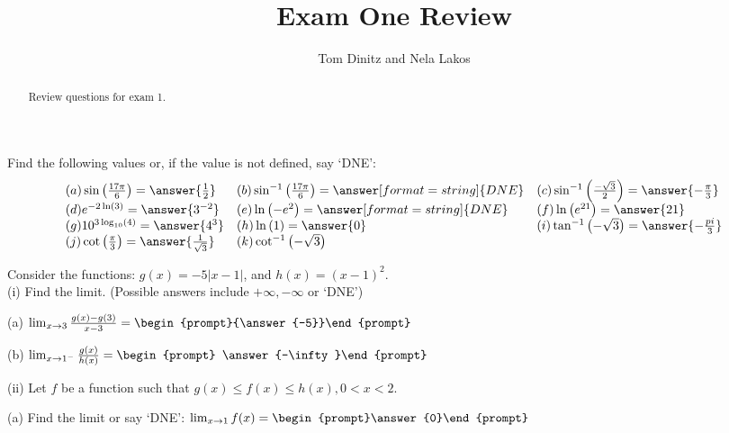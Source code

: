 \documentclass{ximera}
\author{Tom Dinitz and Nela Lakos}
\title{Exam One Review}
\begin{document}
\begin{abstract}
Review questions for exam 1.
\end{abstract}
\maketitle

\begin{exercise}
Find the following values or, if the value is not defined, say `DNE':
\[
\begin{array}{l l l}
(a) \sin\left(\frac{17\pi}{6}\right)=\answer{\frac{1}{2}} & (b) \sin^{-1}\left(\frac{17\pi}{6}\right)=\answer[format=string]{DNE} & (c) \sin^{-1}\left(\frac{-\sqrt{3}}{2}\right)=\answer{-\frac{\pi}{3}} \\
(d) e^{-2\ln(3)}=\answer{3^{-2}} & (e) \ln\left(-e^2\right)=\answer[format=string]{DNE} & (f) \ln\left(e^{21}\right)=\answer{21} \\
(g) 10^{3\log_{10}(4)}=\answer{4^3} & (h) \ln\left(1\right)=\answer{0} & (i) \tan^{-1}\left(-\sqrt{3}\right) =\answer{-\frac{pi}{3}} \\
(j) \cot\left(\frac{\pi}{3}\right)=\answer{\frac{1}{\sqrt{3}}} & (k) \cot^{-1}\left(-\sqrt{3}\right) & 
\end{array}
\]
\end{exercise}

\begin{exercise}
Consider the functions: $g(x)=-5|x-1|$, and $h(x)=(x-1)^2$.\\

(i) Find the limit. (Possible answers include $+\infty, -\infty$ or `DNE')

(a) $\lim_{x\to 3} \frac{g(x)-g(3)}{x-3}=\begin{prompt}{\answer{-5}}\end{prompt}$

(b) $\lim_{x\to 1^-} \frac{g(x)}{h(x)}=\begin{prompt} \answer{-\infty}\end{prompt}$

(ii) Let $f$ be a function such that $g(x)\leq f(x)\leq h(x), 0<x<2$.

(a) Find the limit or say `DNE': $\lim_{x\to 1} f(x)= \begin{prompt}\answer{0}\end{prompt}$
\end{exercise}
\end{document}

